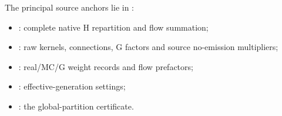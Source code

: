 The principal source anchors lie in
:
\begin{itemize}
 \item {}: complete native H
       repartition and flow summation;
 \item {}: raw kernels, connections,
       G factors and source no-emission multipliers;
 \item {}: real/MC/G weight records and
       flow prefactors;
 \item {}: effective-generation settings;
 \item {}: the global-partition
       certificate.
\end{itemize}
